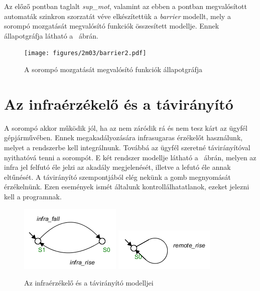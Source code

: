 Az előző pontban taglalt \textit{sup\_mot}, valamint az ebben a pontban megvalósított automaták szinkron szorzatát véve elkészítettük a \textit{barrier} modellt, mely a sorompó mozgatását megvalósító funkciók összesített modellje. Ennek állapotgráfja látható a ~ábrán.

\begin{figure}
	\centering
	\texttt{[image: figures/2m03/barrier2.pdf]}
	\caption{A sorompó mozgatását megvalósító funkciók állapotgráfja}
	\label{fig:Barrier}
\end{figure}




\section{Az infraérzékelő és a távirányító}
A sorompó akkor működik jól, ha az nem záródik rá és nem tesz kárt az ügyfél gépjárművében. Ennek megakadályozására infrasugaras érzékelőt használunk, melyet a rendszerbe kell integrálnunk. Továbbá az ügyfél szeretné távirányítóval nyithatóvá tenni a sorompót. E két rendszer modellje látható a ~ábrán, melyen az infra jel felfutó éle jelzi az akadály megjelenését, illetve a lefutó éle annak eltűnését. A távirányító szempontjából elég nekünk a gomb megnyomását érzékelnünk. Ezen események ismét általunk kontrollálhatatlanok, ezeket jelezni kell a programnak. 

\begin{figure}
	\centering
	\includegraphics[keepaspectratio]{figures/2m03/b2_infra.png}	\includegraphics[keepaspectratio]{figures/2m03/b_remote.png}
	\caption{Az infraérzékelő és a távirányító modelljei}
	\label{fig:InfraRemote}
\end{figure}


